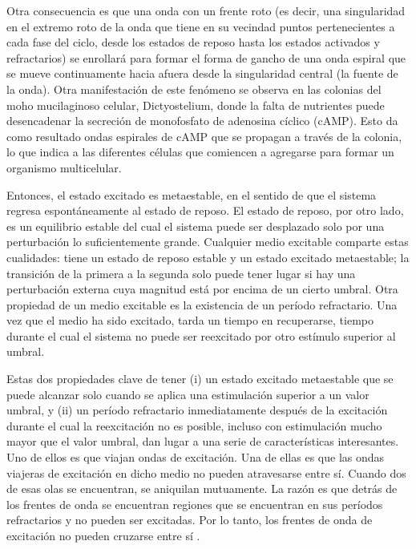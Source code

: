 Otra consecuencia es que una onda con un frente roto (es decir, una singularidad en el extremo roto de la onda que tiene en su vecindad puntos pertenecientes a cada fase del ciclo, desde los estados de reposo hasta los estados activados y refractarios) se enrollará para formar el forma de gancho de una onda espiral que se mueve continuamente hacia afuera desde la singularidad central (la fuente de la onda). Otra manifestación de este fenómeno se observa en las colonias del moho mucilaginoso celular, Dictyostelium, donde la falta de nutrientes puede desencadenar la secreción de monofosfato de adenosina cíclico (cAMP). Esto da como resultado ondas espirales de cAMP que se propagan a través de la colonia, lo que indica a las diferentes células que comiencen a agregarse para formar un organismo multicelular.

Entonces, el estado excitado es metaestable, en el sentido de que el sistema regresa espontáneamente al estado de reposo. El estado de reposo, por otro lado, es un equilibrio estable del cual el sistema puede ser desplazado solo por una perturbación lo suficientemente grande. Cualquier medio excitable comparte estas cualidades: tiene un estado de reposo estable y un estado excitado metaestable; la transición de la primera a la segunda solo puede tener lugar si hay una perturbación externa cuya magnitud está por encima de un cierto umbral. Otra propiedad de un medio excitable es la existencia de un período refractario. Una vez que el medio ha sido excitado, tarda un tiempo en recuperarse, tiempo durante el cual el sistema no puede ser reexcitado por otro estímulo superior al umbral.



Estas dos propiedades clave de tener (i) un estado excitado metaestable que se puede alcanzar solo cuando se aplica una estimulación superior a un valor umbral, y (ii) un período refractario inmediatamente después de la excitación durante el cual la reexcitación no es posible, incluso con estimulación mucho mayor que el valor umbral, dan lugar a una serie de características interesantes. Uno de ellos es que viajan ondas de excitación. Una de ellas es que las ondas viajeras de excitación en dicho medio no pueden atravesarse entre sí. Cuando dos de esas olas se encuentran, se aniquilan mutuamente. La razón es que detrás de los frentes de onda se encuentran regiones que se encuentran en sus períodos refractarios y no pueden ser excitadas. Por lo tanto, los frentes de onda de excitación no pueden cruzarse entre sí \cite{sinha_patterns_2019}. 




